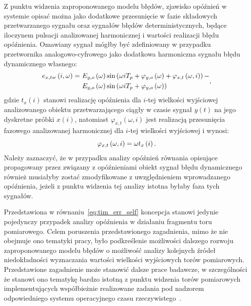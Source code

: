 Z punktu widzenia zaproponowanego modelu błędów, zjawisko opóźnień w systemie opisać można jako dodatkowe przesunięcie w fazie składowych przetwarzanego sygnału oraz sygnałów błędów deterministycznych, będące iloczynem pulsacji analizowanej harmonicznej i wartości realizacji błędu opóźnienia. Omawiany sygnał mógłby być zdefiniowany w przypadku przetwornika analogowo-cyfrowego jako dodatkowa harmoniczna sygnału błędu dynamicznego własnego:
\begin{equation}
\begin{split}
e_{x,tw} \left(i,\omega\right) =~
& E_{y,o} \left(\omega\right) \sin \left( \omega i T_{p} + \varphi_{y,o} \left(\omega\right) + \varphi_{x,t} \left(\omega, i\right) \right) - \\
& E_{y,o} \left(\omega\right) \sin \left( \omega i T_{p} + \varphi_{y,o} \left(\omega\right) \right)
\end{split}
\label{eq:tim_err_self},
\end{equation}
gdzie $t_{x}(i)$ stanowi realizację opóźnienia dla $i$-tej wielkości wyjściowej analizowanego obiektu przetwarzającego ciągły w czasie sygnał $y(t)$ na jego dyskretne próbki $x(i)$, natomiast $\varphi_{x,t}(\omega, i)$ jest realizacją przesunięcia fazowego analizowanej harmonicznej dla $i$-tej wielkości wyjściowej i wynosi:
\begin{equation}
\varphi_{x,t} \left(\omega, i\right) = \omega t_{x} \left(i\right) \label{eq:tim_err_phi}.
\end{equation}
Należy zaznaczyć, że w przypadku analizy opóźnień równania opisujące propagowany przez związany z opóźnieniami obiekt sygnał błędu dynamicznego również musiałyby zostać zmodyfikowane z uwzględnieniem wprowadzanego opóźnienia, jeżeli z punktu widzenia tej analizy istotna byłaby faza tych sygnałów.

Przedstawiona w równaniu~\eqref{eq:tim_err_self} koncepcja stanowi jedynie pojedynczy przypadek analizy opóźnienia w działaniu fragmentu toru pomiarowego. Celem poruszenia przedstawionego zagadnienia, mimo że nie obejmuje ono tematyki pracy, było podkreślenie możliwości dalszego rozwoju zaproponowanego modelu błędów o możliwość analizy kolejnych źródeł niedokładności wyznaczania wartości wielkości wyjściowych torów pomiarowych. Przedstawione zagadnienie może stanowić dalsze prace badawcze, w szczególności że stanowi ono tematykę bardzo istotną z punktu widzenia torów pomiarowych implementujących współbieżnie realizowane zadania pod nadzorem odpowiedniego systemu operacyjnego czasu rzeczywistego~\cite{bandyszak_rtos, laplante_rtos}.

